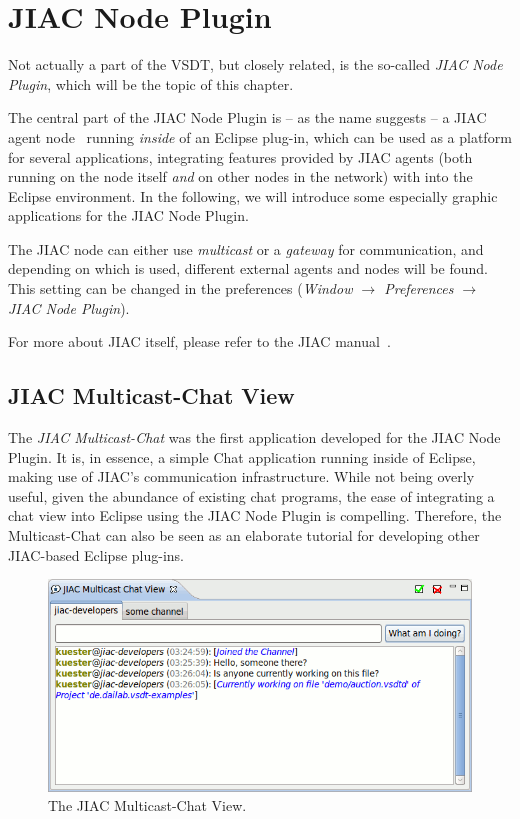 \chapter{JIAC Node Plugin}
\label{sec:user_jiac-node}

Not actually a part of the VSDT, but closely related, is the so-called \emph{JIAC
Node Plugin}, which will be the topic of this chapter.

The central part of the JIAC Node Plugin is -- as the name suggests -- a JIAC
agent node~\cite{lutzenberger2013jiacShort,luetze2015jiacChapter} running 
\emph{inside} of an Eclipse plug-in, which can be used as a platform for several
applications, integrating features provided by JIAC agents (both running on the
node itself \emph{and} on other nodes in the network) with into the Eclipse
environment. In the following, we will introduce some especially graphic
applications for the JIAC Node Plugin.

The JIAC node can either use \emph{multicast} or a \emph{gateway} for communication,
and depending on which is used, different external agents and nodes will be found.
This setting can be changed in the preferences (\emph{Window $\rightarrow$
Preferences $\rightarrow$ JIAC Node Plugin}).

For more about JIAC itself, please refer to the JIAC manual~\cite{jiacManual}.



\section{JIAC Multicast-Chat View}

The \emph{JIAC Multicast-Chat} was the first application developed for the JIAC
Node Plugin.  It is, in essence, a simple Chat application running inside of
Eclipse, making use of JIAC's communication infrastructure.  While not being overly
useful, given the abundance of existing chat programs, the ease of integrating a
chat view into Eclipse using the JIAC Node Plugin is compelling.  Therefore, the
Multicast-Chat can also be seen as an elaborate tutorial for developing other
JIAC-based Eclipse plug-ins.

\begin{figure}[ht]
	\centering
	\includegraphics[width=.5\textwidth]{figures/features/multicast-chat.png}
	\caption{The JIAC Multicast-Chat View.}
	\label{fig:chatView}
\end{figure}

